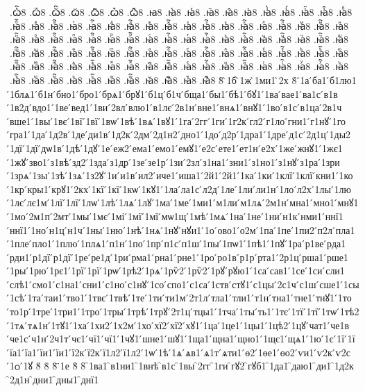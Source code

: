 {.ꙍꙺ҇8
.ꙍꙻ8
.ꙍꙻ҇8
.ꙍ꙼8
.ꙍ꙼҇8
.ꙍ꙽8
.ꙍ꙽҇8
.ꙗ8
.ꙗ̀8
.ꙗ́8
.ꙗ̈8
.ꙗ̑8
.ꙗ҆8
.ꙗ҆̀8
.ꙗ҆́8
.ꙗ҆̈8
.ꙗ҆̑8
.ꙗⷠ8
.ꙗⷠ҇8
.ꙗⷡ8
.ꙗⷡ҇8
.ꙗⷢ8
.ꙗⷢ҇8
.ꙗⷣ8
.ꙗⷣ҇8
.ꙗⷤ8
.ꙗⷤ҇8
.ꙗⷥ8
.ꙗⷥ҇8
.ꙗⷦ8
.ꙗⷦ҇8
.ꙗⷧ8
.ꙗⷧ҇8
.ꙗⷨ8
.ꙗⷨ҇8
.ꙗⷩ8
.ꙗⷩ҇8
.ꙗⷪ8
.ꙗⷪ҇8
.ꙗⷫ8
.ꙗⷫ҇8
.ꙗⷬ8
.ꙗⷬ҇8
.ꙗⷭ8
.ꙗⷭ҇8
.ꙗⷮ8
.ꙗⷮ҇8
.ꙗⷯ8
.ꙗⷯ҇8
.ꙗⷰ8
.ꙗⷰ҇8
.ꙗⷱ8
.ꙗⷱ҇8
.ꙗⷲ8
.ꙗⷲ҇8
.ꙗⷳ8
.ꙗⷳ҇8
.ꙗⷴ8
.ꙗⷴ҇8
.ꙗⷵ8
.ꙗⷵ҇8
.ꙗⷶ8
.ꙗⷶ҇8
.ꙗⷷ8
.ꙗⷷ҇8
.ꙗⷸ8
.ꙗⷸ҇8
.ꙗⷹ8
.ꙗⷹ҇8
.ꙗⷺ8
.ꙗⷺ҇8
.ꙗⷻ8
.ꙗⷻ҇8
.ꙗⷼ8
.ꙗⷼ҇8
.ꙗⷽ8
.ꙗⷽ҇8
.ꙗⷾ8
.ꙗⷾ҇8
.ꙗⷿ8
.ꙗⷿ҇8
.ꙗꙴ8
.ꙗꙴ҇8
.ꙗꙵ8
.ꙗꙵ҇8
.ꙗꙶ8
.ꙗꙶ҇8
.ꙗꙷ8
.ꙗꙷ҇8
.ꙗꙸ8
.ꙗꙸ҇8
.ꙗꙹ8
.ꙗꙹ҇8
.ꙗꙺ8
.ꙗꙺ҇8
.ꙗꙻ8
.ꙗꙻ҇8
.ꙗ꙼8
.ꙗ꙼҇8
.ꙗ꙽8
.ꙗ꙽҇8
8̀
̀1б
̀1ж
̀1ми1
̀2х
8́
́1а
́ба1
́б1лю1
́1блѧ1
́б1н
́бно1
́бро1
́брѧ1
́брꙋ1
́б1ц
́б1ч
́бща1
́бы1
́бѣ1
́бꙋ1
́1ва
́вае1
́ва1с
́в1в
́1в2д
́вдо1
́1ве
́вед1
́1ви
́2вл
́влю1
́в1лє
́2в1н
́вне1
́внѧ1
́внꙋ1
́1во
́в1с
́в1ца
́2в1ч
́вше1
́1вы
́1вє
́1вї
́1вї
́1вѡ
́1вѣ
́1вѧ
́1вꙋ1
́1га
́2гг
́1ги
́1г2к
́гл2
́г1ло
́гни1
́г1нꙋ
́1го
́гра1
́1да
́1д2в
́1де
́ди1в
́1д2к
́2дм
́2д1н2
́дно1
́1до
́д2р
́1дра1
́1дре
́д1с
́2д1ц
́1ды2
́1дї
́1дї
́дѡ1в
́1дѣ
́1дꙋ
́1е
́еж2
́ема1
́емо1
́емꙋ1
́е2с
́ете1
́ет1н
́е2х
́1же
́жнꙋ1
́1жє1
́1жꙋ
́зво1
́з1вѣ
́зд2
́1зда
́з1др
́1зе
́зе1р
́1зи
́2зл
́з1на1
́зни1
́з1но1
́з1нꙋ
́з1ра
́1зри
́1зрѧ
́1зы
́1зѣ
́1зѧ
́1з2ꙋ
́1и
́и1в
́ил2
́иче1
́иша1
́2й1
́2й1
́1ка
́1ки
́1клї
́1клї
́кни1
́1ко
́1кр
́кры1
́крꙋ1
́2кх
́1кї
́1кї
́1кѡ
́1кꙋ1
́1ла
́ла1с
́л2д
́1ле
́1ли
́ли1н
́1ло
́л2х
́1лы
́1лю
́1лє
́лє1м
́1лї
́1лї
́1лѡ
́1лѣ
́1лѧ
́1лꙋ
́1ма
́1ме
́1ми1
́м1ли
́м1лѧ
́2м1н
́мна1
́мно1
́мнꙋ1
́1мо
́2м1п
́2мт
́1мы
́1мє
́1мі
́1мї
́1мї
́мѡ1щ
́1мѣ
́1мѧ
́1на
́1не
́1ни
́н1к
́нми1
́ннї1
́ннї1
́1но
́н1ц
́н1ч
́1ны
́1ню
́1нѣ
́1нѧ
́1нꙋ
́нꙋи1
́1о
́ово1
́о2м
́1па
́1пе
́1пи2
́п2л
́пла1
́1пле
́пло1
́1плю
́1плѧ1
́п1н
́1по
́1пр
́п1с
́п1ш
́1пы
́1пѡ1
́1пѣ1
́1пꙋ
́1ра
́р1ве
́рда1
́рди1
́р1дї
́р1дї
́1ре
́ре1д
́1ри
́рма1
́рна1
́рне1
́1ро
́ро1в
́р1р
́рта1
́2р1ц
́рша1
́рше1
́1ры
́1рю
́1рє1
́1рї
́1рї
́1рѡ
́1рѣ2
́1рѧ
́1рѷ2
́1рѷ2
́1рꙋ
́рꙋю1
́1са
́сав1
́1се
́1си
́сли1
́слѣ1
́смо1
́с1на1
́сни1
́с1но
́с1нꙋ
́1со
́спо1
́с1са
́1ств
́стꙋ1
́с1цы
́2с1ч
́с1ш
́сше1
́1сы
́1сѣ
́1та
́таи1
́тво1
́1твє
́1твѣ
́1те
́1ти
́ти1м
́2т1л
́тла1
́тли1
́т1н
́тна1
́тне1
́тнꙋ1
́1то
́то1р
́1тре
́1три1
́1тро
́1тры
́1трѣ
́1трꙋ
́2т1ц
́тцы1
́1тча
́1ты
́ть1
́1тє
́1тї
́1тї
́1тѡ
́1тѣ2
́1тѧ
́тѧ1н
́1тꙋ1
́1ха
́1хи2
́1х2м
́1хо
́хї2
́хї2
́хꙋ1
́1ца
́1це1
́1цы1
́1цѣ2
́1цꙋ
́чат1
́че1в
́че1с
́ч1н
́2ч1т
́чє1
́чї1
́чї1
́1чꙋ1
́шне1
́шꙋ1
́1ща1
́щна1
́щно1
́1щє1
́щѧ1
́1ю
́1є
́1ї
́1ї
́їа1
́їа1
́їи1
́їи1
́ї2к
́ї2к
́ї1л2
́ї1л2
́1ѡ
́1ѣ
́1ѧ
́ѧв1
́ѧ1т
́ѧти1
́ѳ2
́1ѳе1
́ѳо2
́ѵи1
́ѵ2к
́ѵ2с
́1ѻ
́1ꙋ
8̆
8̇
8̈
̈1е
8̏
8̑
̑1ва1
̑в1ни1
̑1внѣ
̑в1с
̑1вы
̑2гг
̑1ги
̑гꙋ2
̑гꙋб1
̑1да1
̑даю1
̑ди1
̑1д2к
̑2д1н
̑дни1
̑дны1
̑днї1
}
